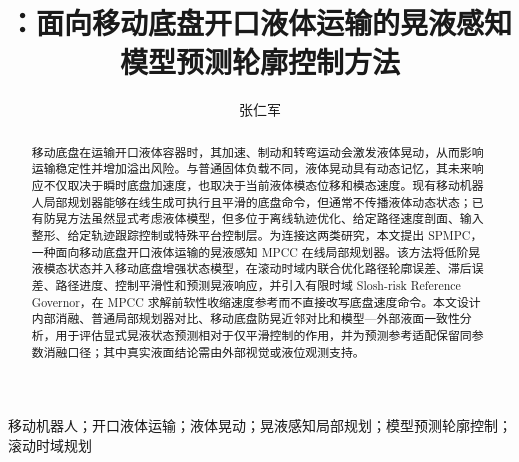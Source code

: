 \documentclass[letterpaper,10pt,journal,twoside]{IEEEtran}
\title{\SPMPC{}：面向移动底盘开口液体运输的晃液感知模型预测轮廓控制方法}
\author{张仁军}
\date{}
\newcommand{\SPMPC}{SPMPC}
\newcommand{\MPCC}{MPCC}
\begin{document}
\maketitle

\begin{abstract}
移动底盘在运输开口液体容器时，其加速、制动和转弯运动会激发液体晃动，从而影响运输稳定性并增加溢出风险。与普通固体负载不同，液体晃动具有动态记忆，其未来响应不仅取决于瞬时底盘加速度，也取决于当前液体模态位移和模态速度。现有移动机器人局部规划器能够在线生成可执行且平滑的底盘命令，但通常不传播液体动态状态；已有防晃方法虽然显式考虑液体模型，但多位于离线轨迹优化、给定路径速度剖面、输入整形、给定轨迹跟踪控制或特殊平台控制层。为连接这两类研究，本文提出 \SPMPC{}，一种面向移动底盘开口液体运输的晃液感知 \MPCC{} 在线局部规划器。该方法将低阶晃液模态状态并入移动底盘增强状态模型，在滚动时域内联合优化路径轮廓误差、滞后误差、路径进度、控制平滑性和预测晃液响应，并引入有限时域 Slosh-risk Reference Governor，在 \MPCC{} 求解前软性收缩速度参考而不直接改写底盘速度命令。本文设计内部消融、普通局部规划器对比、移动底盘防晃近邻对比和模型—外部液面一致性分析，用于评估显式晃液状态预测相对于仅平滑控制的作用，并为预测参考适配保留同参数消融口径；其中真实液面结论需由外部视觉或液位观测支持。
\end{abstract}

\begin{IEEEkeywords}
移动机器人；开口液体运输；液体晃动；晃液感知局部规划；模型预测轮廓控制；滚动时域规划
\end{IEEEkeywords}









\end{document}
